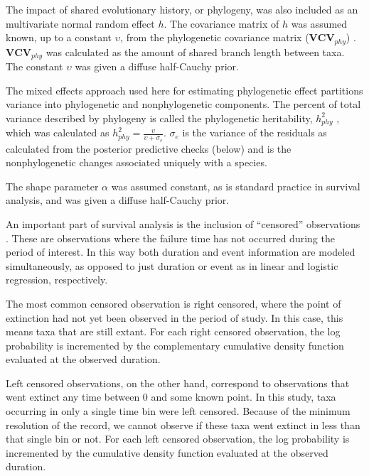 \documentclass[12pt,letterpaper]{article}
\begin{document}
The impact of shared evolutionary history, or phylogeny, was also included as an multivariate normal random effect \(h\). The covariance matrix of \(h\) was assumed known, up to a constant \(\upsilon\), from the phylogenetic covariance matrix (\(\mathbf{VCV}_{phy}\)) \citep{Lynch1991,Housworth2004}. \(\mathbf{VCV}_{phy}\) was calculated as the amount of shared branch length between taxa. The constant \(\upsilon\) was given a diffuse half-Cauchy prior. 

The mixed effects approach used here for estimating phylogenetic effect partitions variance into phylogenetic and nonphylogenetic components. The percent of total variance described by phylogeny is called the phylogenetic heritability, \(h^{2}_{phy}\) \citep{Housworth2004}, which was calculated as \(h^{2}_{phy} = \frac{\upsilon}{\upsilon + \sigma_{e}}\). \(\sigma_{e}\) is the variance of the residuals as calculated from the posterior predictive checks (below) and is the nonphylogenetic changes associated uniquely with a species.

The shape parameter \(\alpha\) was assumed constant, as is standard practice in survival analysis, and was given a diffuse half-Cauchy prior. 


An important part of survival analysis is the inclusion of ``censored'' observations \citep{Ibrahim2001,Kleinbaum2005}. These are observations where the failure time has not occurred during the period of interest. In this way both duration and event information are modeled simultaneously, as opposed to just duration or event as in linear and logistic regression, respectively. 

The most common censored observation is right censored, where the point of extinction had not yet been observed in the period of study. In this case, this means taxa that are still extant. For each right censored observation, the log probability is incremented by the complementary cumulative density function evaluated at the observed duration.

Left censored observations, on the other hand, correspond to observations that went extinct any time between 0 and some known point. In this study, taxa occurring in only a single time bin were left censored. Because of the minimum resolution of the record, we cannot observe if these taxa went extinct in less than that single bin or not. For each left censored observation, the log probability is incremented by the cumulative density function evaluated at the observed duration.
\end{document}
